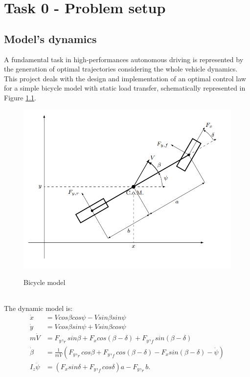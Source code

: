 \documentclass[a4paper,11pt,oneside]{book}
\begin{document}
\chapter{Task 0 - Problem setup}
\section{Model's dynamics}
A fundamental task in high-performances autonomous driving is represented by the generation of optimal trajectories considering the whole vehicle dynamics.\\
This project deals with the design and implementation of an optimal control law for a simple bicycle model with static load transfer, schematically represented in Figure \ref{fig:bicycle_model}. \\
\begin{figure}[h]
    \centering
    \includegraphics[scale=.40]{figs/Fig1} \\
    \caption{Bicycle model}
    \label{fig:bicycle_model}
\end{figure}
\\
The dynamic model is:
\begin{align*}
\dot x &= V cos \beta cos \psi - V sin \beta sin \psi \\
\dot y &= V cos \beta sin \psi + V sin \beta cos \psi \\
 m \dot V &= F_y,_r sin \beta+F_x cos(\beta - \delta) + F_y,_f sin(\beta - \delta)\\
\dot \beta &= \frac{1}{mV} (F_y,_r cos \beta + F_y,_f cos (\beta-\delta)-F_x sin(\beta-\delta)-\dot\psi)\\
I_z \ddot \psi &= (F_x sin \delta + F_y,_f cos \delta) a - F_y,_r b.
\end{align*}
\end{document}
